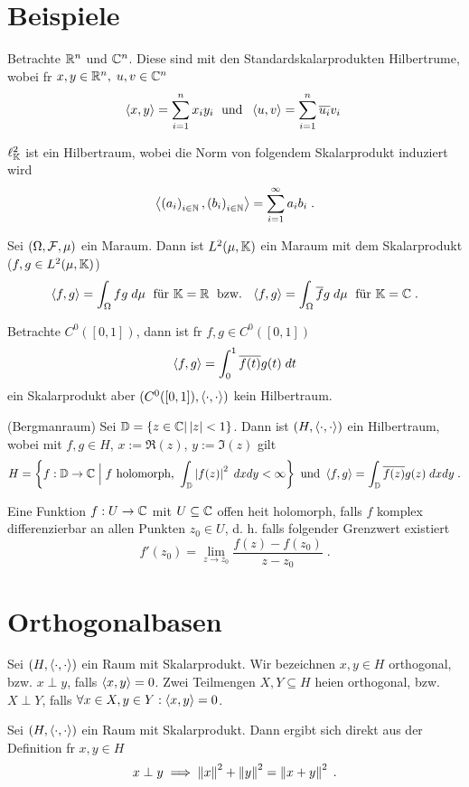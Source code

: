 \section{Beispiele}
\begin{ex}
	Betrachte \(\mathbb{R}^n\) und \(\mathbb{C}^n\). Diese sind mit den Standardskalarprodukten Hilbertr\as ume, wobei f\us r \(x, y \in \mathbb{R}^n,\; u,v \in \mathbb{C}^n\)
	\[\left\langle x,y\right\rangle = \sum_{i=1}^n x_i y_i \;\text{ und }\; \left\langle u,v\right\rangle = \sum_{i=1}^n \overline{u_i}v_i\;\]
\end{ex}
\begin{ex}
	\(\ell^2_{\mathbb{K}}\) ist ein Hilbertraum, wobei die Norm von folgendem Skalarprodukt induziert wird
	\[\left\langle\left (a_i\right )_{i\in \mathbb{N}}, \left (b_i\right )_{i\in \mathbb{N}}\right\rangle = \sum_{i=1}^\infty a_i b_i\;.\]
\end{ex}

\begin{ex}
	Sei \((\Omega, \mathcal{F}, \mu)\) ein Ma\s raum. Dann ist \(L^2(\mu, \mathbb{K})\) ein Ma\s raum mit dem Skalarprodukt (\(f,g \in L^2(\mu,\mathbb{K})\))
	\[ \left\langle f,g\right\rangle = \int_\Omega f g \;d\mu \;\text{ f{\"u}r } \mathbb{K} = \mathbb{R} \;\text{ bzw. }\; \left\langle f,g\right\rangle = \int_\Omega \overline{f}g \;d\mu \;\text{ f{\"u}r }\mathbb{K} = \mathbb{C}\;.\] 
\end{ex}

\begin{ex}
	Betrachte \(C^0([0,1])\), dann ist f\us r \(f,g\in C^0([0,1])\)
	\[ \left\langle f,g\right\rangle = \int_0^1 \overline{f(t)} g(t) \; dt\]
	ein Skalarprodukt aber \((C^0([0,1]), \left\langle\cdot,\cdot\right\rangle)\) kein Hilbertraum.
	\end{ex}
	
\begin{ex}(Bergmanraum)
	Sei \(\mathbb{D} = \left\{z \in\mathbb{C} \vert \left\lvert z \right\rvert < 1\right\}\). Dann ist \((H, \left\langle\cdot, \cdot\right\rangle)\) ein Hilbertraum, wobei mit \(f,g \in H\), \(x:= \Re(z)\), \(y:= \Im(z)\) gilt
	\[H = \left\{f:\mathbb{D} \to \mathbb{C} \;\Big\vert\; f \text{ holomorph, } \int_\mathbb{D} \left\lvert f(z) \right\rvert^2 \;dxdy < \infty\right\} \text{ und } \left\langle f,g\right\rangle = \int_\mathbb{D} \overline{f(z)} g(z)\; dx dy\;.\]
\end{ex}
\begin{rem}
	Eine Funktion \(f: U \to \mathbb{C}\) mit \(U\subseteq \mathbb{C}\) offen  hei\s t holomorph, falls $f$ komplex differenzierbar an allen Punkten \(z_0 \in U\), d. h. falls folgender Grenzwert existiert 
	\[f'(z_0) = \lim_{z\to z_0} \frac{f(z) - f(z_0)}{z-z_0}\;.\]
\end{rem}

\section{Orthogonalbasen}
\begin{definition}
	Sei \((H, \left\langle\cdot, \cdot\right\rangle)\) ein Raum mit Skalarprodukt. Wir bezeichnen \(x,y \in H\) orthogonal, bzw. \(x\perp y\), falls \(\left\langle x,y\right\rangle = 0\). Zwei Teilmengen \(X, Y \subseteq H\) hei\s en orthogonal, bzw. \(X \perp Y\), falls \(\forall x \in X, y \in Y: \left\langle x,y\right\rangle = 0\).
\end{definition}
\begin{lemma}
	Sei \((H, \left\langle\cdot, \cdot\right\rangle)\) ein Raum mit Skalarprodukt. Dann ergibt sich direkt aus der Definition f\us r \(x,y\in H\)
	\[x \perp y \implies \left\lVert x\right\rVert^2 + \left\lVert y\right\rVert^2 = \left\lVert x+y\right\rVert^2\;.\]
\end{lemma}


